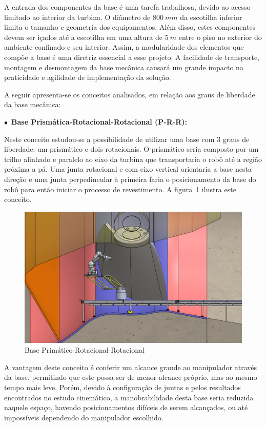 A entrada dos componentes da base é uma tarefa trabalhosa, devido ao acesso
limitado ao interior da turbina. O diâmetro de $800~mm$ da escotilha inferior
limita o tamanho e geometria dos equipamentos. Além disso, estes componentes devem ser
içados até a escotilha em uma altura de $5~m$ entre o piso no exterior do
ambiente confinado e seu interior. Assim, a modularidade dos elementos que compõe a base
é uma diretriz essencial a esse projeto. A facilidade de transporte, montagem e
desmontagem da base mecânica causará um grande impacto na praticidade e
agilidade de implementação da solução.

A seguir apresenta-se os conceitos analisados, em relação aos graus de
liberdade da base mecânica:

$\bullet$~\textbf{Base Prismática-Rotacional-Rotacional (P-R-R):}
  
  Neste conceito estudou-se a possibilidade de utilizar uma base com $3$ graus
  de liberdade: um prismático e dois rotacionais. O prismático seria composto
  por um trilho alinhado e paralelo ao eixo da turbina que transportaria o robô
  até a região próxima a pá. Uma junta rotacional e com eixo vertical orientaria
  a base nesta direção e uma junta perpedincular à primeira faria o
  posicionamento da base do robô para então iniciar o processo de revestimento.
  A figura~\ref{fig::base_prr} ilustra este conceito.
    
  \begin{figure}[h!]
   \centering
   \includegraphics[width=0.8\columnwidth]{figs/bases/base_prr}
   \caption{Base Primático-Rotacional-Rotacional}
   \label{fig::base_prr}
\end{figure}

  A vantagem deste conceito é conferir um alcance grande ao manipulador através
  da base, permitindo que este possa ser de menor alcance próprio, mas ao mesmo
  tempo mais leve.
  Porém, devido à configuração de juntas e pelos resultados encontrados no
  estudo cinemático, a manobrabilidade desta base seria reduzida naquele espaço,
  havendo posicionamentos difíceis de serem alcançados, ou até impossíveis
  dependendo do manipulador escolhido.
  
